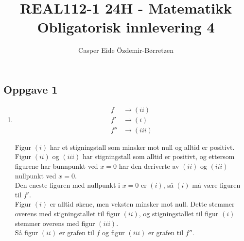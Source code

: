\documentclass[11pt,a4paper]{report}
\title{REAL112-1 24H - Matematikk\\Obligatorisk innlevering 4}
\author{Casper Eide Özdemir-Børretzen}
\date{}
\newcommand{\opg}[1]{\subsection*{Oppgave #1}}
\begin{document}



\opg{1}
\begin{enumerate}[leftmargin=*,itemsep=1cm,labelsep=2em,label=\alph*)]
\item[]
\begin{align*}
f &\rightarrow (ii)\\
f' &\rightarrow (i)\\
f'' &\rightarrow (iii)
\end{align*}

Figur $(i)$ har et stigningstall som minsker mot null og alltid er positivt.\\
Figur $(ii)$ og $(iii)$ har stigningstall som alltid er positivt, og ettersom figurene har bunnpunkt ved $x=0$ har den deriverte av $(ii)$ og $(iii)$ nullpunkt ved $x=0$.\\
Den eneste figuren med nullpunkt i $x=0$ er $(i)$, så $(i)$ må være figuren til $f'$.\\
Figur $(i)$ er alltid økene, men veksten minsker mot null. Dette stemmer overens med stigningstallet til figur $(ii)$, og stigningstallet til figur $(i)$ stemmer overens med figur $(iii)$.\\
Så figur $(ii)$ er grafen til $f$ og figur $(iii)$ er grafen til $f''$.
\end{enumerate}

\end{document}
